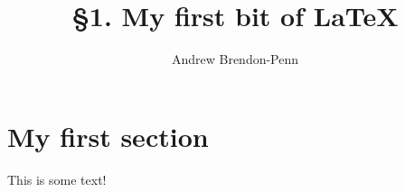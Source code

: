 \documentclass[a4paper,11pt]{article}
\title{\S1. My first bit of \LaTeX}
\author{Andrew Brendon-Penn}
\begin{document}
\maketitle

\section{My first section}

This is some text!
\end{document}
